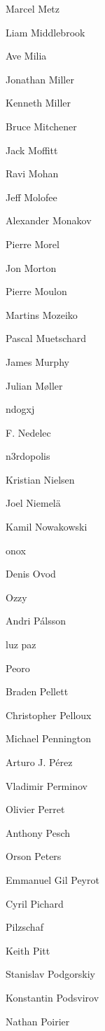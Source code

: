 \begin{DoxyItemize}
\item Marcel Metz
\item Liam Middlebrook
\item Ave Milia
\item Jonathan Miller
\item Kenneth Miller
\item Bruce Mitchener
\item Jack Moffitt
\item Ravi Mohan
\item Jeff Molofee
\item Alexander Monakov
\item Pierre Morel
\item Jon Morton
\item Pierre Moulon
\item Martins Mozeiko
\item Pascal Muetschard
\item James Murphy
\item Julian Møller
\item ndogxj
\item F. Nedelec
\item n3rdopolis
\item Kristian Nielsen
\item Joel Niemelä
\item Kamil Nowakowski
\item onox
\item Denis Ovod
\item Ozzy
\item Andri Pálsson
\item luz paz
\item Peoro
\item Braden Pellett
\item Christopher Pelloux
\item Michael Pennington
\item Arturo J. Pérez
\item Vladimir Perminov
\item Olivier Perret
\item Anthony Pesch
\item Orson Peters
\item Emmanuel Gil Peyrot
\item Cyril Pichard
\item Pilzschaf
\item Keith Pitt
\item Stanislav Podgorskiy
\item Konstantin Podsvirov
\item Nathan Poirier

\end{DoxyItemize}
